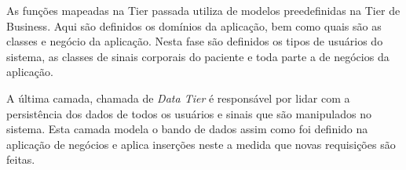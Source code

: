 As funções mapeadas na Tier passada utiliza de modelos preedefinidas na Tier de Business.
Aqui são definidos os domínios da aplicação, bem como quais são as classes e negócio da
aplicação. Nesta fase são definidos os tipos de usuários do sistema, as classes de sinais
corporais do paciente e toda parte a de negócios da aplicação.

A última camada, chamada de \textit{Data Tier} é responsável por lidar com a persistência dos dados
de todos os usuários e sinais que são manipulados no sistema. Esta camada modela o
bando de dados assim como foi definido na aplicação de negócios e aplica
inserções neste a medida que novas requisições são feitas.
